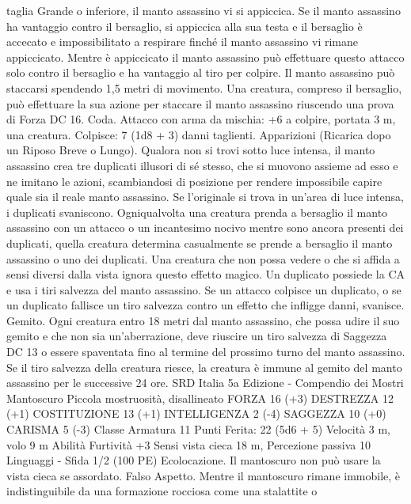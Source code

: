 \begin{multicols}{2}
taglia Grande o inferiore, il manto assassino vi si appiccica. Se il
manto assassino ha vantaggio contro il bersaglio, si appiccica
alla sua testa e il bersaglio è accecato e impossibilitato a
respirare finché il manto assassino vi rimane appiccicato. Mentre
è appiccicato il manto assassino può effettuare questo attacco
solo contro il bersaglio e ha vantaggio al tiro per colpire. Il
manto assassino può staccarsi spendendo 1,5 metri di
movimento. Una creatura, compreso il bersaglio, può effettuare
la sua azione per staccare il manto assassino riuscendo una prova
di Forza DC 16.
Coda. Attacco con arma da mischia: +6 a colpire, portata 3 m,
una creatura.
Colpisce: 7 (1d8 + 3) danni taglienti.
Apparizioni (Ricarica dopo un Riposo Breve o Lungo). Qualora
non si trovi sotto luce intensa, il manto assassino crea tre
duplicati illusori di sé stesso, che si muovono assieme ad esso e
ne imitano le azioni, scambiandosi di posizione per rendere
impossibile capire quale sia il reale manto assassino. Se
l'originale si trova in un’area di luce intensa, i duplicati
svaniscono.
Ogniqualvolta una creatura prenda a bersaglio il manto assassino
con un attacco o un incantesimo nocivo mentre sono ancora
presenti dei duplicati, quella creatura determina casualmente se
prende a bersaglio il manto assassino o uno dei duplicati. Una
creatura che non possa vedere o che si affida a sensi diversi dalla
vista ignora questo effetto magico.
Un duplicato possiede la CA e usa i tiri salvezza del manto assassino.
Se un attacco colpisce un duplicato, o se un duplicato fallisce un tiro
salvezza contro un effetto che infligge danni, svanisce.
Gemito. Ogni creatura entro 18 metri dal manto assassino, che possa
udire il suo gemito e che non sia un’aberrazione, deve riuscire un tiro
salvezza di Saggezza DC 13 o essere spaventata fino al termine del
prossimo turno del manto assassino. Se il tiro salvezza della creatura
riesce, la creatura è immune al gemito del manto assassino per le
successive 24 ore.
SRD Italia 5a Edizione - Compendio dei Mostri
Mantoscuro
Piccola mostruosità, disallineato
FORZA 16 (+3)
DESTREZZA 12 (+1)
COSTITUZIONE 13 (+1)
INTELLIGENZA 2 (-4)
SAGGEZZA 10 (+0)
CARISMA 5 (-3)
Classe Armatura 11
\hspace*{0pt}\hfill{Punti Ferita}: 22 (5d6 + 5)
Velocità 3 m, volo 9 m
Abilità Furtività +3
Sensi vista cieca 18 m, Percezione passiva 10
Linguaggi -
Sfida 1/2 (100 PE)
Ecolocazione. Il mantoscuro non può usare la vista cieca se
assordato.
Falso Aspetto. Mentre il mantoscuro rimane immobile, è
indistinguibile da una formazione rocciosa come una stalattite o

\end{multicols}
